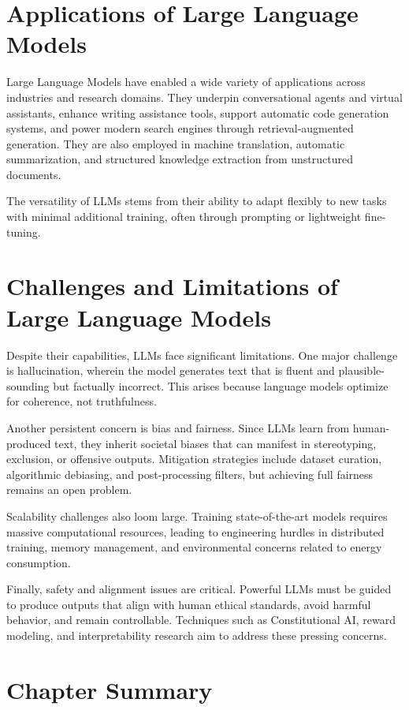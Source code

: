 \documentclass[openany]{book}
\begin{document}
\section{Applications of Large Language Models}

Large Language Models have enabled a wide variety of applications across 
industries and research domains. They underpin conversational agents and virtual 
assistants, enhance writing assistance tools, support automatic code generation 
systems, and power modern search engines through retrieval-augmented generation. 
They are also employed in machine translation, automatic summarization, and 
structured knowledge extraction from unstructured documents.

The versatility of LLMs stems from their ability to adapt flexibly to new tasks 
with minimal additional training, often through prompting or lightweight 
fine-tuning.

\section{Challenges and Limitations of Large Language Models}

Despite their capabilities, LLMs face significant limitations. One major 
challenge is hallucination, wherein the model generates text that is fluent and 
plausible-sounding but factually incorrect. This arises because language models 
optimize for coherence, not truthfulness.

Another persistent concern is bias and fairness. Since LLMs learn from 
human-produced text, they inherit societal biases that can manifest in 
stereotyping, exclusion, or offensive outputs. Mitigation strategies include 
dataset curation, algorithmic debiasing, and post-processing filters, but 
achieving full fairness remains an open problem.

Scalability challenges also loom large. Training state-of-the-art models 
requires massive computational resources, leading to engineering hurdles in 
distributed training, memory management, and environmental concerns related to 
energy consumption.

Finally, safety and alignment issues are critical. Powerful LLMs must be guided 
to produce outputs that align with human ethical standards, avoid harmful 
behavior, and remain controllable. Techniques such as Constitutional AI, reward 
modeling, and interpretability research aim to address these pressing concerns.

\section{Chapter Summary}
\end{document}
